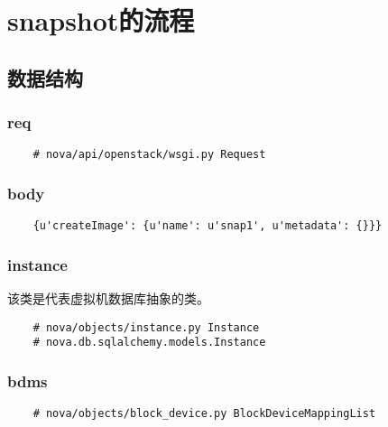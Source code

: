 \documentclass[a4paper,left=1.5cm,right=1.5cm,11pt]{article}
\begin{document}
\tableofcontents

\clearpage

\section{snapshot的流程}
\subsection{数据结构}
\subsubsection{req}
    \begin{lstlisting}
    # nova/api/openstack/wsgi.py Request
    \end{lstlisting}

\subsubsection{body}
    \begin{lstlisting}
    {u'createImage': {u'name': u'snap1', u'metadata': {}}}
    \end{lstlisting}

\subsubsection{instance}
    该类是代表虚拟机数据库抽象的类。

    \begin{lstlisting}
    # nova/objects/instance.py Instance
    # nova.db.sqlalchemy.models.Instance
    \end{lstlisting}

\subsubsection{bdms}
    \begin{lstlisting}
    # nova/objects/block_device.py BlockDeviceMappingList
    \end{lstlisting}
\end{document}

